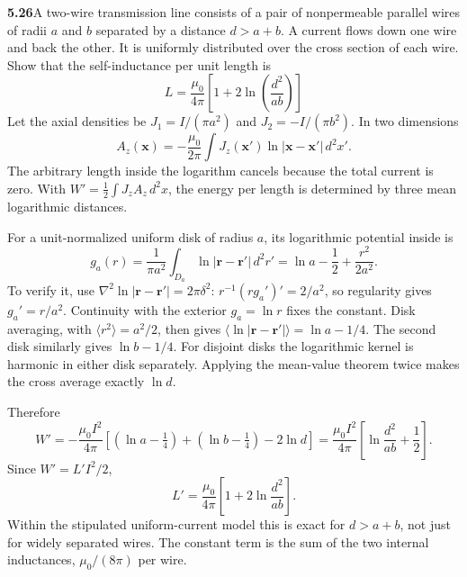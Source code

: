\par\bigskip
\noindent\textbf{5.26}\quad A two-wire transmission line consists of a pair of nonpermeable parallel wires of radii $a$ and $b$ separated by a distance $d>a+b$. A current flows down one wire and back the other. It is uniformly distributed over the cross section of each wire. Show that the self-inductance per unit length is
\[
L=\frac{\mu_{0}}{4\pi}\left[1+2\ln\!\left(\frac{d^{2}}{ab}\right)\right]
\]
\solution
Let the axial densities be $J_1=I/(\pi a^2)$ and
$J_2=-I/(\pi b^2)$. In two dimensions
\[
A_z(\mathbf x)=-\frac{\mu_0}{2\pi}
\int J_z(\mathbf x')\ln|\mathbf x-\mathbf x'|\,d^2x'.
\]
The arbitrary length inside the logarithm cancels because the total
current is zero. With $W'=\frac12\int J_zA_z\,d^2x$, the energy per
length is determined by three mean logarithmic distances.

For a unit-normalized uniform disk of radius $a$, its logarithmic
potential inside is
\[
g_a(r)=\frac1{\pi a^2}\int_{D_a}\ln|\mathbf r-\mathbf r'|\,d^2r'
=\ln a-\frac12+\frac{r^2}{2a^2}.
\]
To verify it, use $\nabla^2\ln|\mathbf r-\mathbf r'|=2\pi\delta^2$:
$r^{-1}(rg_a')'=2/a^2$, so regularity gives $g_a'=r/a^2$.
Continuity with the exterior $g_a=\ln r$ fixes the constant.
Disk averaging, with $\langle r^2\rangle=a^2/2$, then gives
$\langle\ln|\mathbf r-\mathbf r'|\rangle=\ln a-1/4$.
The second disk similarly gives $\ln b-1/4$.
For disjoint disks the logarithmic kernel is harmonic in either
disk separately. Applying the mean-value theorem twice makes the
cross average exactly $\ln d$.

Therefore
\[
W'=-\frac{\mu_0I^2}{4\pi}
\left[(\ln a-\tfrac14)+(\ln b-\tfrac14)-2\ln d\right]
=\frac{\mu_0I^2}{4\pi}
\left[\ln\frac{d^2}{ab}+\frac12\right].
\]
Since $W'=L'I^2/2$,
\[
\boxed{L'=\frac{\mu_0}{4\pi}
\left[1+2\ln\frac{d^2}{ab}\right].}
\]
Within the stipulated uniform-current model this is exact for
$d>a+b$, not just for widely separated wires.
The constant term is the sum of the two internal inductances,
$\mu_0/(8\pi)$ per wire.


